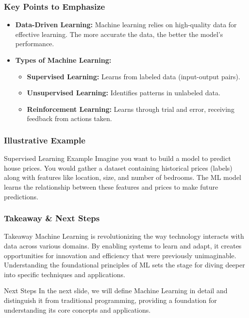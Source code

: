 \documentclass[aspectratio=169]{beamer}
\begin{document}
\begin{frame}[fragile]
    \frametitle{Key Points to Emphasize}
    \begin{itemize}
        \item \textbf{Data-Driven Learning:} Machine learning relies on high-quality data for effective learning. The more accurate the data, the better the model's performance.
        \item \textbf{Types of Machine Learning:}
            \begin{itemize}
                \item \textbf{Supervised Learning:} Learns from labeled data (input-output pairs).
                \item \textbf{Unsupervised Learning:} Identifies patterns in unlabeled data.
                \item \textbf{Reinforcement Learning:} Learns through trial and error, receiving feedback from actions taken.
            \end{itemize}
    \end{itemize}
\end{frame}

\begin{frame}[fragile]
    \frametitle{Illustrative Example}
    \begin{block}{Supervised Learning Example}
        Imagine you want to build a model to predict house prices. You would gather a dataset containing historical prices (labels) along with features like location, size, and number of bedrooms. The ML model learns the relationship between these features and prices to make future predictions.
    \end{block}
\end{frame}

\begin{frame}[fragile]
    \frametitle{Takeaway \& Next Steps}
    \begin{block}{Takeaway}
        Machine Learning is revolutionizing the way technology interacts with data across various domains. By enabling systems to learn and adapt, it creates opportunities for innovation and efficiency that were previously unimaginable. Understanding the foundational principles of ML sets the stage for diving deeper into specific techniques and applications.
    \end{block}
    \begin{block}{Next Steps}
        In the next slide, we will define Machine Learning in detail and distinguish it from traditional programming, providing a foundation for understanding its core concepts and applications.
    \end{block}
\end{frame}
\end{document}
